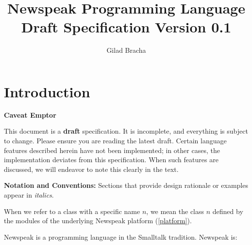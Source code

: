 \documentclass{article}
\title{Newspeak Programming Language Draft Specification Version 0.1}
\author{Gilad Bracha}
\begin{document}
\maketitle
\tableofcontents

\section{Introduction}

{\em

 {\bf Caveat Emptor}
 
This document is a {\bf  draft} specification. It is incomplete, and everything is subject to change. Please ensure you are reading the latest draft. Certain language features described herein have not been implemented; in other cases, the implementation deviates from this specification. When such features are discussed, we will endeavor to note this clearly in the text.

}


{\bf Notation and Conventions:} Sections that provide design rationale or examples appear in {\em italics}. 

When we refer to a class with a specific name $n$, we mean the class $n$ defined by the modules of the underlying Newspeak platform (\ref{platform}).

Newspeak is a programming language in the Smalltalk \cite{GoldbergRobson83} tradition.  
Newspeak is:
\end{document}
